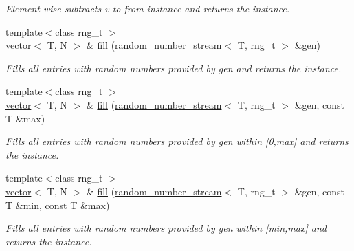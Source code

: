 \begin{DoxyCompactItemize}
\begin{DoxyCompactList}\small\item\em Element-\/wise subtracts v to from instance and returns the instance. \end{DoxyCompactList}\item 
\hypertarget{a00579_a7fa78fad2c26bf76dcc569515693482b}{}{\footnotesize template$<$class rng\+\_\+t $>$ }\\\hyperlink{a00579}{vector}$<$ T, N $>$ \& \hyperlink{a00579_a7fa78fad2c26bf76dcc569515693482b}{fill} (\hyperlink{a00471}{random\+\_\+number\+\_\+stream}$<$ T, rng\+\_\+t $>$ \&gen)\label{a00579_a7fa78fad2c26bf76dcc569515693482b}

\begin{DoxyCompactList}\small\item\em Fills all entries with random numbers provided by gen and returns the instance. \end{DoxyCompactList}\item 
\hypertarget{a00579_ad2affeafb1a2522a18619447ee2d1974}{}{\footnotesize template$<$class rng\+\_\+t $>$ }\\\hyperlink{a00579}{vector}$<$ T, N $>$ \& \hyperlink{a00579_ad2affeafb1a2522a18619447ee2d1974}{fill} (\hyperlink{a00471}{random\+\_\+number\+\_\+stream}$<$ T, rng\+\_\+t $>$ \&gen, const T \&max)\label{a00579_ad2affeafb1a2522a18619447ee2d1974}

\begin{DoxyCompactList}\small\item\em Fills all entries with random numbers provided by gen within \mbox{[}0,max\mbox{]} and returns the instance. \end{DoxyCompactList}\item 
\hypertarget{a00579_a45515ec7e82b53ad46cccd8ac9b0d1ae}{}{\footnotesize template$<$class rng\+\_\+t $>$ }\\\hyperlink{a00579}{vector}$<$ T, N $>$ \& \hyperlink{a00579_a45515ec7e82b53ad46cccd8ac9b0d1ae}{fill} (\hyperlink{a00471}{random\+\_\+number\+\_\+stream}$<$ T, rng\+\_\+t $>$ \&gen, const T \&min, const T \&max)\label{a00579_a45515ec7e82b53ad46cccd8ac9b0d1ae}

\begin{DoxyCompactList}\small\item\em Fills all entries with random numbers provided by gen within \mbox{[}min,max\mbox{]} and returns the instance. \end{DoxyCompactList}\end{DoxyCompactItemize}

